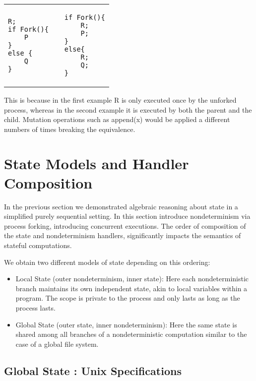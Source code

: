 \documentclass[logo,bsc,singlespacing,parskip]{infthesis}
\begin{document}
\vspace{-2em}
\begin{table}[H]
\centering
\begin{tabular}{p{} c p{}}
\begin{lstlisting}
R;
if Fork(){
    P
}
else {
    Q
}
\end{lstlisting}
&
&
\begin{lstlisting}
if Fork(){
    R; 
    P;
} 
else{
    R; 
    Q; 
}
\end{lstlisting}
\end{tabular}
\end{table}
\vspace{-2em}
This is because in the first example R is only executed once by the unforked process, whereas in the second example it is executed by both the parent and the child. 
Mutation operations such as append(x) would be applied a different numbers of times breaking the equivalence.





\section{State Models and Handler Composition}
In the previous section we demonstrated algebraic reasoning about state in a simplified purely sequential setting. In this section introduce nondeterminism via process forking, introducing concurrent executions. 
The order of composition of the state and nondeterminism handlers, significantly impacts the semantics of stateful computations. 

We obtain two different models of state depending on this ordering:
\begin{itemize}
    \item Local State (outer nondeterminism, inner state): Here each nondeterministic branch maintains its own independent state, akin to local variables within a program. The scope is private to the process and only lasts as long as the process lasts.
    \item Global State (outer state, inner nondeterminism): Here the same state is shared among all branches of a nondeterministic computation similar to the case of a global file system.
\end{itemize}







\subsection{Global State : Unix Specifications}
\end{document}
